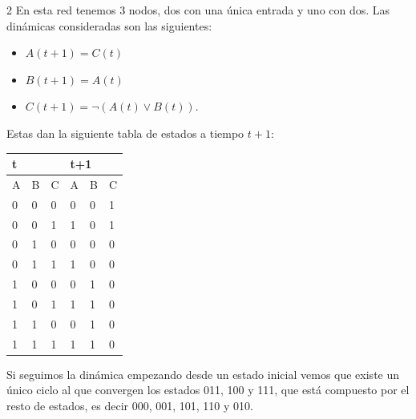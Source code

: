 \documentclass[spanish, 12pt, a4paper]{article}
\begin{document}
\begin{multicols}{2}
En esta red tenemos 3 nodos, dos con una única entrada y uno con dos. Las dinámicas consideradas son las siguientes:
\begin{itemize}
    \item $A(t+1) = C(t)$
    \item $B(t+1) = A(t)$
    \item $C(t+1) = \lnot \left( A(t) \lor B(t)\right)$.
\end{itemize}

Estas dan la siguiente tabla de estados a tiempo $t+1$:

\begin{table}[H]
    \begin{tabular}{|lll|lll|}
    \hline
    \multicolumn{3}{|l|}{t}                              & \multicolumn{3}{l|}{t+1}                            \\ \hline
    \multicolumn{1}{|l|}{A} & \multicolumn{1}{l|}{B} & C & \multicolumn{1}{l|}{A} & \multicolumn{1}{l|}{B} & C \\ \hline
    \multicolumn{1}{|l|}{0} & \multicolumn{1}{l|}{0} & 0 & \multicolumn{1}{l|}{0} & \multicolumn{1}{l|}{0} & 1 \\ \hline
    \multicolumn{1}{|l|}{0} & \multicolumn{1}{l|}{0} & 1 & \multicolumn{1}{l|}{1} & \multicolumn{1}{l|}{0} & 1 \\ \hline
    \multicolumn{1}{|l|}{0} & \multicolumn{1}{l|}{1} & 0 & \multicolumn{1}{l|}{0} & \multicolumn{1}{l|}{0} & 0 \\ \hline
    \multicolumn{1}{|l|}{0} & \multicolumn{1}{l|}{1} & 1 & \multicolumn{1}{l|}{1} & \multicolumn{1}{l|}{0} & 0 \\ \hline
    \multicolumn{1}{|l|}{1} & \multicolumn{1}{l|}{0} & 0 & \multicolumn{1}{l|}{0} & \multicolumn{1}{l|}{1} & 0 \\ \hline
    \multicolumn{1}{|l|}{1} & \multicolumn{1}{l|}{0} & 1 & \multicolumn{1}{l|}{1} & \multicolumn{1}{l|}{1} & 0 \\ \hline
    \multicolumn{1}{|l|}{1} & \multicolumn{1}{l|}{1} & 0 & \multicolumn{1}{l|}{0} & \multicolumn{1}{l|}{1} & 0 \\ \hline
    \multicolumn{1}{|l|}{1} & \multicolumn{1}{l|}{1} & 1 & \multicolumn{1}{l|}{1} & \multicolumn{1}{l|}{1} & 0 \\ \hline
    \end{tabular}
\end{table}
Si seguimos la dinámica empezando desde un estado inicial vemos que existe un único ciclo al que convergen los estados 011, 100 y 111, que está compuesto por el resto de estados, es decir 000, 001, 101, 110 y 010.


\end{multicols}
\end{document}
